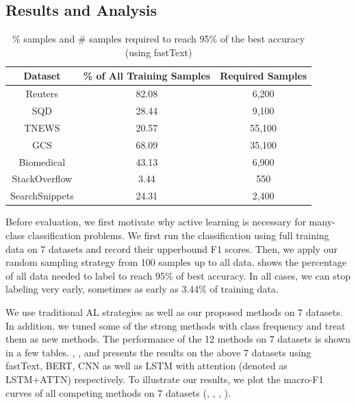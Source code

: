 \subsection{Results and Analysis}
\label{sec:results}

\begin{table}[th]
	\scriptsize
	\centering
	\begin{tabular}{ccc}
		\toprule
		Dataset & \% of All Training Samples & Required Samples \\ \hline
		Reuters & 82.08   &  6,200 \\
		SQD     & 28.44   &  9,100 \\
		TNEWS   & 20.57    &  55,100 \\
		GCS     & 68.09   &  35,100 \\
		Biomedical & 43.13 & 6,900\\
		StackOverflow & 3.44 &550 \\
		SearchSnippets & 24.31 & 2,400 \\
		\bottomrule
	\end{tabular}
	\caption{\% samples and \# samples required to reach 95\% of the best accuracy (using fastText)}
	\label{table:all_radiusfreq}
\end{table}


Before evaluation, we first motivate why active learning is necessary for 
many-class classification problems. We first run the classification using full training data
on 7 datasets and record their upperbound F1 scores. Then, we apply our 
random sampling strategy from 100 samples up to all data.  
 shows the percentage of all data needed 
to label to reach 95\% of best accuracy. 
In all cases, we can stop labeling very early, sometimes as early as 3.44\% of
training data. 

We use traditional AL strategies as well as our proposed methods on $7$ datasets. 
In addition, we tuned some of the strong methods with class frequency and treat them as new methods. The performance of the 12 methods on 7 datasets is shown in a few tables. , ,  and  presents the results on the above 7 datasets using fastText, BERT, CNN as well as LSTM with attention (denoted as LSTM+ATTN) respectively. To illustrate our results, we plot the macro-F1 curves of 
all competing methods on 7 datasets (, , , ).

